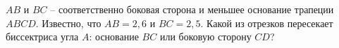 \begin{ex}
	\begin{condition}
		\( AB \) и \( BC \) – соответственно боковая сторона и меньшее основание трапеции \( ABCD \). Известно, что \( AB = 2,6  \) и \( BC = 2,5 \). Какой из отрезков пересекает биссектриса угла \( A\): основание \( BC  \) или боковую сторону \( CD \)?
	\end{condition}
\end{ex}